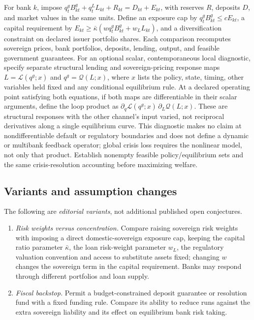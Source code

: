 \documentclass[11pt,a4paper]{article}
\begin{document}
For bank \(k\), impose \(q_t^gB^g_{kt}+q_t^L L_{kt}+R_{kt}=D_{kt}+E_{kt}\), with reserves \(R\), deposits \(D\), and market values in the same units. Define an exposure cap by \(q_t^gB^g_{kt}\le cE_{kt}\), a capital requirement by \(E_{kt}\ge\bar\kappa(wq_t^gB^g_{kt}+w_LL_{kt})\), and a diversification constraint on declared issuer portfolio shares. Each comparison recomputes sovereign prices, bank portfolios, deposits, lending, output, and feasible government guarantees. For an optional scalar, contemporaneous local diagnostic, specify separate structural lending and sovereign-pricing response maps \(L=\mathcal L(q^g;x)\) and \(q^g=\mathcal Q(L;x)\), where \(x\) lists the policy, state, timing, other variables held fixed and any conditional equilibrium rule. At a declared operating point satisfying both equations, if both maps are differentiable in their scalar arguments, define the loop product as \(\partial_q\mathcal L(q^g;x)\,\partial_L\mathcal Q(L;x)\). These are structural responses with the other channel's input varied, not reciprocal derivatives along a single equilibrium curve. This diagnostic makes no claim at nondifferentiable default or regulatory boundaries and does not define a dynamic or multibank feedback operator; global crisis loss requires the nonlinear model, not only that product. Establish nonempty feasible policy/equilibrium sets and the same crisis-resolution accounting before maximizing welfare.
\subsection*{Variants and assumption changes}
The following are \emph{editorial variants}, not additional published open conjectures.
\begin{enumerate}
\item \emph{Risk weights versus concentration.} Compare raising sovereign risk weights with imposing a direct domestic-sovereign exposure cap, keeping the capital ratio parameter \(\bar\kappa\), the loan risk-weight parameter \(w_L\), the regulatory valuation convention and access to substitute assets fixed; changing \(w\) changes the sovereign term in the capital requirement. Banks may respond through different portfolios and loan supply.
\item \emph{Fiscal backstop.} Permit a budget-constrained deposit guarantee or resolution fund with a fixed funding rule. Compare its ability to reduce runs against the extra sovereign liability and its effect on equilibrium bank risk taking.
\end{enumerate}
\end{document}
